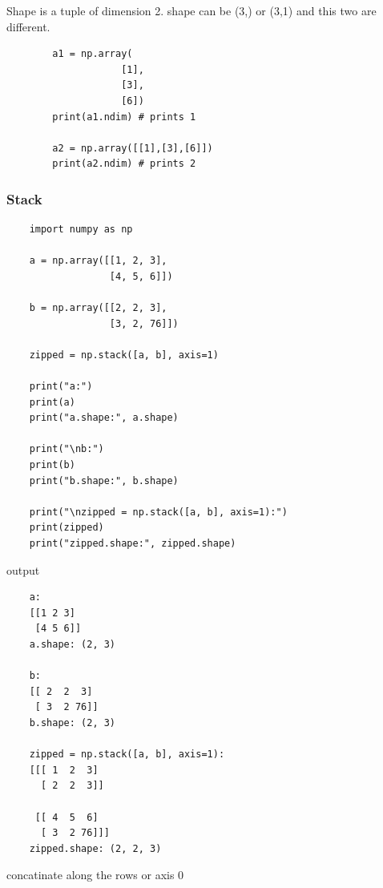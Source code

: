 \documentclass{book}
\begin{document}

Shape is a tuple of dimension 2. shape can be (3,) or (3,1) and this two are different.

\begin{verbatim}
        a1 = np.array(
                    [1],
                    [3],
                    [6])
        print(a1.ndim) # prints 1
        
        a2 = np.array([[1],[3],[6]])
        print(a2.ndim) # prints 2
\end{verbatim}

\subsubsection{Stack}


\begin{verbatim}
    import numpy as np

    a = np.array([[1, 2, 3],
                  [4, 5, 6]])
    
    b = np.array([[2, 2, 3],
                  [3, 2, 76]])
    
    zipped = np.stack([a, b], axis=1)
    
    print("a:")
    print(a)
    print("a.shape:", a.shape)
    
    print("\nb:")
    print(b)
    print("b.shape:", b.shape)
    
    print("\nzipped = np.stack([a, b], axis=1):")
    print(zipped)
    print("zipped.shape:", zipped.shape)
\end{verbatim}

output

\begin{verbatim}
    a:
    [[1 2 3]
     [4 5 6]]
    a.shape: (2, 3)
    
    b:
    [[ 2  2  3]
     [ 3  2 76]]
    b.shape: (2, 3)
    
    zipped = np.stack([a, b], axis=1):
    [[[ 1  2  3]
      [ 2  2  3]]
    
     [[ 4  5  6]
      [ 3  2 76]]]
    zipped.shape: (2, 2, 3)
\end{verbatim}


concatinate along the rows or axis 0
\end{document}
